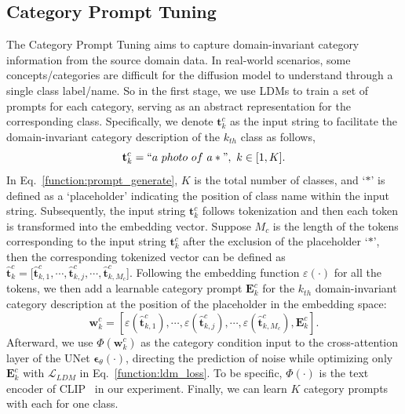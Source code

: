 \subsection{Category Prompt Tuning} \label{CPT}
The Category Prompt Tuning aims to capture domain-invariant category information from the source domain data.
In real-world scenarios, some concepts/categories are difficult for the diffusion model to understand through a single class label/name. 
So in the first stage, we use LDMs to train a set of prompts for each category, serving as an abstract representation for the corresponding class. 
Specifically, we denote  $\mathbf{t}^{c}_{k}$ as the input string to facilitate the domain-invariant category description of the $k_{th}$ class as follows, 
\begin{equation}
    \mathbf{t}_k^c = ``a \ photo \ of \ a \ast", \ k \in [1,K].
    \label{function:prompt_generate}
\end{equation}
In Eq.~\textcolor{red}{\ref{function:prompt_generate}}, $K$ is the total number of classes, and `$\ast$' is defined as a `placeholder' indicating the position of class name within the input string. 
Subsequently, the input string $\mathbf{t}_k^c$ follows tokenization and then each token is transformed into the embedding vector. 
Suppose $M_c$ is the length of the tokens corresponding to the input string $\mathbf{t}_k^c$ after the exclusion of the placeholder `$\ast$', then the corresponding tokenized vector can be defined as $\hat{\mathbf{t}}_k^c = [\hat{\mathbf{t}}_{k,1}^c,\cdots, \hat{\mathbf{t}}_{k,j}^c, \cdots, \hat{\mathbf{t}}_{k,M_c}^c$]. Following the embedding function $\varepsilon(\cdot)$ for all the tokens, we then add a learnable category prompt $\mathbf{E}^c_k$ for the $k_{th}$ domain-invariant category description at the position of the placeholder in the embedding space:
\begin{equation}
    \mathbf{w}_k^c=[\varepsilon(\hat{\mathbf{t}}_{k,1}^c),\cdots,\varepsilon(\hat{\mathbf{t}}_{k,j}^c),\cdots,\varepsilon(\hat{\mathbf{t}}_{k,M_c}^c), \mathbf{E}^c_k ].
    \label{function:token_generate}
\end{equation}
Afterward, we use $\Phi(\mathbf{w}_k^c)$ as the category condition input to the cross-attention layer of the UNet $\mathbf{\epsilon}_{\theta}(\cdot)$, directing the prediction of noise while optimizing only $\mathbf{E}^c_k$ with $\mathcal{L}_{LDM}$ in Eq.~\textcolor{red}{\ref{function:ldm_loss}}. 
To be specific, $\Phi(\cdot)$ is the text encoder of CLIP~\cite{radford2021learning} in our experiment. Finally, we can learn $K$ category prompts with each for one class.


